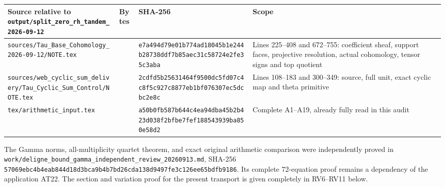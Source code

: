{\def\LTcaptype{none} %
\begin{longtable}[]{@{}
  >{\raggedright\arraybackslash}p{}
  >{\raggedleft\arraybackslash}p{}
  >{\raggedright\arraybackslash}p{}
  >{\raggedright\arraybackslash}p{}@{}}
\toprule\noalign{}
\begin{minipage}[b]{\linewidth}\raggedright
Source relative to \nolinkurl{output/split_zero_rh_tandem_2026-09-12}
\end{minipage} & \begin{minipage}[b]{\linewidth}\raggedleft
Bytes
\end{minipage} & \begin{minipage}[b]{\linewidth}\raggedright
SHA-256
\end{minipage} & \begin{minipage}[b]{\linewidth}\raggedright
Scope
\end{minipage} \\
\midrule\noalign{}
\endhead
\bottomrule\noalign{}
\endlastfoot
\nolinkurl{sources/Tau_Base_Cohomology_2026-09-12/NOTE.tex} & 28353 & \nolinkurl{e7a494d79e01b774ad18045b1e244b28738ddf7b85aec31c58724e2fe35c3aba} & Lines 225--408 and 672--755: coefficient sheaf, support faces, projective resolution, actual cohomology, tensor signs and top quotient \\
\nolinkurl{sources/web_cyclic_sum_delivery/Tau_Cyclic_Sum_Control/NOTE.tex} & 41804 & \nolinkurl{2cdfd5b25631464f9500dc5fd07c4c8f5c927c8877eb1bf076307ec5dcbc2e8c} & Lines 108--183 and 300--349: source, full unit, exact cyclic map and theta primitive \\
\nolinkurl{tex/arithmetic_input.tex} & 14644 & \nolinkurl{a50b0fb587b644c4ea94dba45b2b423d038f2bfbe7fef188543939ba850e58d2} & Complete A1--A19, already fully read in this audit \\
\end{longtable}
}

The Gamma norms, all-multiplicity quartet theorem, and exact original arithmetic comparison were independently proved in \nolinkurl{work/deligne_bound_gamma_independent_review_20260913.md}, SHA-256 \nolinkurl{57069ebc4b4eab844d18d3bca9b4b7bd26cda138d9497fe3c126ee65bdfb9186}. Its complete 72-equation proof remains a dependency of the application AT22. The section and variation proof for the present transport is given completely in RV6--RV11 below.

